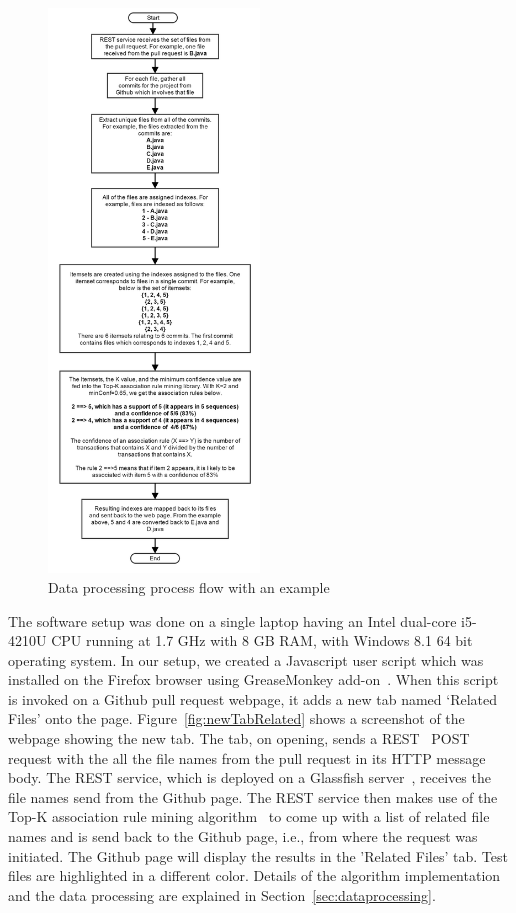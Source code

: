 \begin{figure}[ht!]
\includegraphics[width=0.5\textwidth]{data_processing_spmf}
\caption{Data processing process flow with an example}
\label{fig:data_processing_spmf}
\end{figure}

The software setup was done on a single laptop having an Intel dual-core i5-4210U CPU running at 1.7 GHz with 8 GB RAM, with Windows 8.1 64 bit operating system. In our setup, we created a Javascript user script which was installed on the Firefox browser using GreaseMonkey add-on~\cite{greasemonkey1,greasemonkey2}. When this script is invoked on a Github pull request webpage, it adds a new tab named `Related Files' onto the page. Figure~\ref{fig:newTabRelated} shows a screenshot of the webpage showing the new tab. The tab, on opening, sends a REST~\cite{rest} POST~\cite{post_http} request with the all the file names from the pull request in its HTTP message body. The REST service, which is deployed on a Glassfish server~\cite{glassfish}, receives the file names send from the Github page. The REST service then makes use of the Top-K association rule mining algorithm~\cite{fournier2012mining} to come up with a list of related file names and is send back to the Github page, i.e., from where the request was initiated. The Github page will display the results in the 'Related Files' tab. Test files are highlighted in a different color. Details of the algorithm implementation and the data processing are explained in Section~\ref{sec:dataprocessing}.

